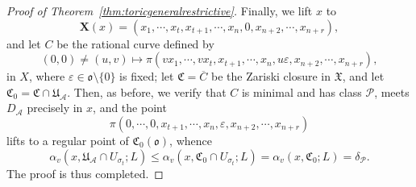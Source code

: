 \documentclass[a4paper, twoside, 11pt]{amsart}
\theoremstyle{definition}
\newcommand{\cA}{\mathcal{A}}
\newcommand{\cP}{\mathcal{P}}
\newcommand{\bX}{{\boldsymbol{X}}}
\newcommand{\mC}{\mathfrak{C}}
\newcommand{\mU}{\mathfrak{U}}
\newcommand{\mX}{\mathfrak{X}}
\newcommand{\fo}{\mathfrak{o}}
\begin{document}
\begin{proof}[Proof of Theorem~\ref{thm:toricgeneralrestrictive}]
Finally, we lift $x$ to
\begin{equation*}
	\bX(x)=(x_1,\cdots,x_t,x_{t+1},\cdots,x_n,0,x_{n+2},\cdots,x_{n+r}),
\end{equation*}
and let $C$ be the rational curve defined by 
\begin{equation*}
	(0,0)\neq(u,v)\mapsto \pi(vx_1,\cdots,vx_t,x_{t+1},\cdots,x_n,u\varepsilon,x_{n+2},\cdots,x_{n+r}),
\end{equation*}
in $X$, where $\varepsilon\in\fo\setminus\{0\}$ is fixed; let $\mC=\overline{C}$ be the Zariski closure in $\mX$, and let $\mC_0=\mC\cap \mU_{\cA}$. Then, as before, we verify that $C$ is minimal and has class $\cP$, meets $D_\cA$ precisely in $x$, and the point
\begin{equation*}
	\pi(0,\cdots,0,x_{t+1},\cdots,x_n,\varepsilon,x_{n+2},\cdots,x_{n+r})
\end{equation*}
lifts to a regular point of $\mC_0(\fo)$, whence 
\begin{equation*}
	\alpha_v(x,\mU_{\cA}\cap U_{\sigma_t};L)\leq\alpha_v(x,\mC_0\cap U_{\sigma_t};L)=\alpha_v(x,\mC_0;L)=\delta_\cP.
\end{equation*}
The proof is thus completed.
\end{proof}


\end{document}
